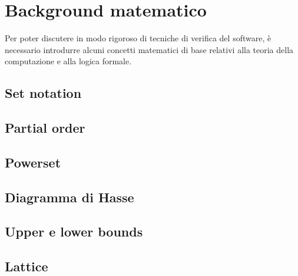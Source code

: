 \section{Background matematico}
Per poter discutere in modo rigoroso di tecniche di verifica del software,
è necessario introdurre alcuni concetti matematici di base relativi alla
teoria della computazione e alla logica formale.

\subsection{Set notation}
\subsection{Partial order}
\subsection{Powerset}
\subsection{Diagramma di Hasse}
\subsection{Upper e lower bounds}
\subsection{Lattice}
